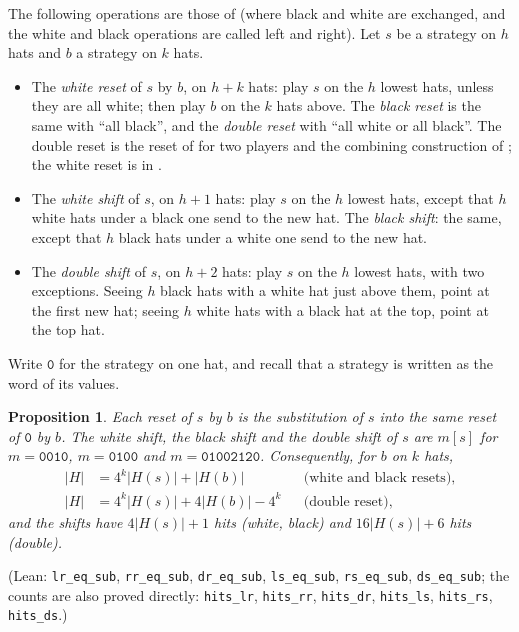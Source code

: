 \documentclass[11pt,a4paper]{article}
\newtheorem{proposition}[theorem]{Proposition}
\theoremstyle{definition}
\theoremstyle{remark}
\newcommand{\lean}[1]{\texttt{#1}}
\newcommand{\str}[1]{\mathtt{#1}}
\begin{document}
The following operations are those of \cite{R20} (where black and white
are exchanged, and the white and black operations are called left and
right). Let $s$ be a strategy on $h$ hats and $b$ a strategy on $k$ hats.
\begin{itemize}
\item The \emph{white reset} of $s$ by $b$, on $h+k$ hats: play $s$ on
  the $h$ lowest hats, unless they are all white; then play $b$ on the
  $k$ hats above. The \emph{black reset} is the same with ``all black'',
  and the \emph{double reset} with ``all white or all black''. The
  double reset is the reset of \cite{BFG} for two players and the
  combining construction of \cite{BCCZW}; the white reset is in
  \cite{Wa14}.
\item The \emph{white shift} of $s$, on $h+1$ hats: play $s$ on the $h$
  lowest hats, except that $h$ white hats under a black one send to the
  new hat. The \emph{black shift}: the same, except that $h$ black hats
  under a white one send to the new hat.
\item The \emph{double shift} of $s$, on $h+2$ hats: play $s$ on the $h$
  lowest hats, with two exceptions. Seeing $h$ black hats with a white
  hat just above them, point at the first new hat; seeing $h$ white hats
  with a black hat at the top, point at the top hat.
\end{itemize}
Write $\str{0}$ for the strategy on one hat, and recall that a strategy
is written as the word of its values.

\begin{proposition}\label{prop:instances}
Each reset of $s$ by $b$ is the substitution of $s$ into the same reset
of $\str{0}$ by $b$. The white shift, the black shift and the double
shift of $s$ are $m[s]$ for $m = \str{0010}$, $m = \str{0100}$ and
$m = \str{01002120}$. Consequently, for $b$ on $k$ hats,
\begin{align*}
  |H| &= 4^k|H(s)| + |H(b)| && \text{(white and black resets)},\\
  |H| &= 4^k|H(s)| + 4|H(b)| - 4^k && \text{(double reset)},
\end{align*}
and the shifts have $4|H(s)|+1$ hits (white, black) and
$16|H(s)|+6$ hits (double).
\end{proposition}

(Lean: \lean{lr\_eq\_sub}, \lean{rr\_eq\_sub}, \lean{dr\_eq\_sub},
\lean{ls\_eq\_sub}, \lean{rs\_eq\_sub}, \lean{ds\_eq\_sub}; the counts
are also proved directly: \lean{hits\_lr}, \lean{hits\_rr},
\lean{hits\_dr}, \lean{hits\_ls}, \lean{hits\_rs}, \lean{hits\_ds}.)
\end{document}
